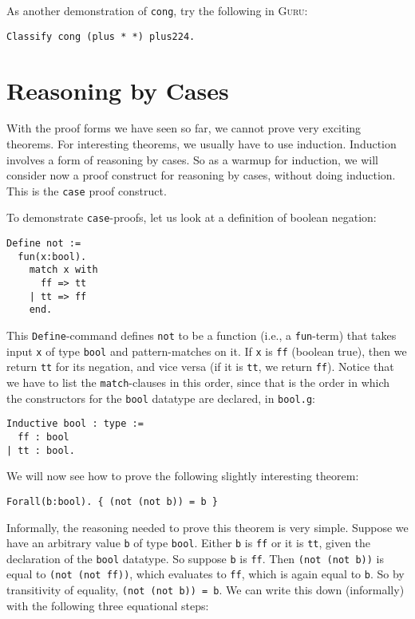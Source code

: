 \documentclass{book}[12pt]
\newcommand{\guru}[0]{\textsc{Guru}\xspace}
\begin{document}
\noindent As another demonstration of \texttt{cong}, try the following in \guru:

\begin{verbatim}
Classify cong (plus * *) plus224.
\end{verbatim}

\section{Reasoning by Cases}
\label{ch3:case}

With the proof forms we have seen so far, we cannot prove very
exciting theorems.  For interesting theorems, we usually have to use
induction.  Induction involves a form of reasoning by cases.  So as a
warmup for induction, we will consider now a proof construct for
reasoning by cases, without doing induction.  This is the \texttt{case}
proof construct.

To demonstrate \texttt{case}-proofs, let us look at a definition of
boolean negation:

\begin{verbatim}
Define not :=
  fun(x:bool).
    match x with
      ff => tt
    | tt => ff
    end.
\end{verbatim}

\noindent This \texttt{Define}-command defines \texttt{not} to be a
function (i.e., a \texttt{fun}-term) that takes input \texttt{x} of
type \texttt{bool} and pattern-matches on it.  If \texttt{x} is
\texttt{ff} (boolean true), then we return \texttt{tt} for its
negation, and vice versa (if it is \texttt{tt}, we return
\texttt{ff}).  Notice that we have to list the \texttt{match}-clauses
in this order, since that is the order in which the constructors
for the \texttt{bool} datatype are declared, in \texttt{bool.g}:

\begin{verbatim}
Inductive bool : type :=
  ff : bool
| tt : bool.
\end{verbatim}

We will now see how to prove the following slightly interesting
theorem:

\begin{verbatim}
Forall(b:bool). { (not (not b)) = b }
\end{verbatim}

\noindent Informally, the reasoning needed to prove this theorem is
very simple.  Suppose we have an arbitrary value \texttt{b} of type
\texttt{bool}.  Either \texttt{b} is \texttt{ff} or it is \texttt{tt},
given the declaration of the \texttt{bool} datatype.  So suppose
\texttt{b} is \texttt{ff}.  Then \texttt{(not (not b))} is equal to
\texttt{(not (not ff))}, which evaluates to \texttt{ff}, which is
again equal to \texttt{b}.  So by transitivity of equality,
\texttt{(not (not b)) = b}.  We can write this down (informally) with
the following three equational steps:
\end{document}
